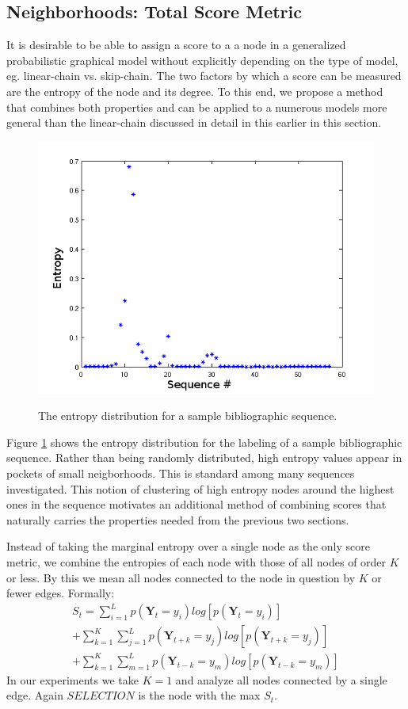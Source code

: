 \subsection{Neighborhoods: Total Score Metric}
It is desirable to be able to assign a score to a a node in a generalized probabilistic graphical model without explicitly depending on the type of model, eg. linear-chain vs. skip-chain.  The two factors by which a score can be measured are the entropy of the node and its degree.  To this end, we propose a method that combines both properties and can be applied to a numerous models more general than the linear-chain discussed in detail in this earlier in this section.

\begin{figure}
\centering
\includegraphics[width=0.9\linewidth]{images/ent_dist1.png}
\label{fig:ent}
\caption[example]{The entropy distribution for a sample bibliographic sequence.}
\end{figure}

Figure \ref{fig:ent} shows the entropy distribution for the labeling of a sample bibliographic sequence.  Rather than being randomly distributed, high entropy values appear in pockets of small neigborhoods.  This is standard among many sequences investigated.  This notion of clustering of high entropy nodes around the highest ones in the sequence motivates an additional method of combining scores that naturally carries the properties needed from the previous two sections.

Instead of taking the marginal entropy over a single node as the only score metric, we combine the entropies of each node with those of all nodes of order $K$ or less.  By this we mean all nodes connected to the node in question by $K$ or fewer edges.  Formally:
\begin{multline}
S_{t} = \sum_{i=1}^{L}p(\mathbf{Y}_{t} = y_{i})log[p(\mathbf{Y}_{t} = y_{i})]\\
+\sum_{k=1}^{K}\sum_{j=1}^{L}p(\mathbf{Y}_{t+k} = y_{j})log[p(\mathbf{Y}_{t+k} = y_{j})]\\
+\sum_{k=1}^{K}\sum_{m=1}^{L}p(\mathbf{Y}_{t-k} = y_{m})log[p(\mathbf{Y}_{t-k} = y_{m})]
\end{multline}
In our experiments we take $K=1$ and analyze all nodes connected by a single edge.  Again $SELECTION$ is the node with the max $S_{t}$.

